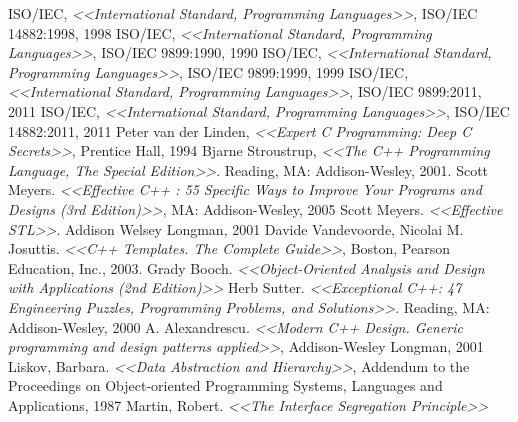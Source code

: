\documentclass[a4paper,12pt,oneside]{article}
\begin{document}
\pagebreak
{}
\begin{thebibliography}{99}
 ISO/IEC, \textit{<<International Standard, Programming Languages>>}, ISO/IEC 14882:1998, 1998
 ISO/IEC, \textit{<<International Standard, Programming Languages>>}, ISO/IEC 9899:1990, 1990
 ISO/IEC, \textit{<<International Standard, Programming Languages>>}, ISO/IEC 9899:1999, 1999
 ISO/IEC, \textit{<<International Standard, Programming Languages>>}, ISO/IEC 9899:2011, 2011
 ISO/IEC, \textit{<<International Standard, Programming Languages>>}, ISO/IEC 14882:2011, 2011
 Peter van der Linden, \textit{<<Expert C Programming: Deep C Secrets>>}, Prentice Hall, 1994
 Bjarne Stroustrup, \textit{<<The C++ Programming Language, The Special Edition>>}. Reading, MA: Addison-Wesley, 2001.
 Scott Meyers. \textit{<<Effective C++ : 55 Specific Ways to Improve Your Programs and Designs (3rd Edition)>>}, MA: Addison-Wesley, 2005
 Scott Meyers. \textit{<<Effective STL>>}. Addison Welsey Longman, 2001
 Davide Vandevoorde, Nicolai M. Josuttis. \textit{<<C++ Templates. The Complete Guide>>}, Boston, Pearson Education, Inc., 2003.
 Grady Booch. \textit{<<Object-Oriented Analysis and Design with Applications (2nd Edition)>>}
 Herb Sutter. \textit{<<Exceptional C++: 47 Engineering Puzzles, Programming Problems, and Solutions>>}. Reading, MA: Addison-Wesley, 2000
 A. Alexandrescu. \textit{<<Modern C++ Design. Generic programming and design patterns applied>>}, Addison-Wesley Longman, 2001
 Liskov, Barbara. \textit{<<Data Abstraction and Hierarchy>>}, Addendum to the Proceedings on Object-oriented Programming Systems, Languages and Applications, 1987
 Martin, Robert. \textit{<<The Interface Segregation Principle>>}
\end{thebibliography}

\pagebreak
{}
\printindex
\end{document}
